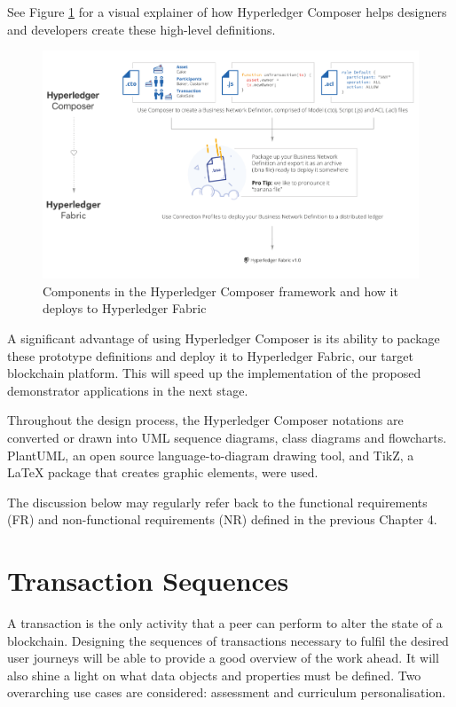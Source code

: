 See Figure \ref{fig:composer2fabric} for a visual explainer of how Hyperledger Composer
helps designers and developers create these high-level definitions.

\begin{figure}[!ht]
	\centering
	\includegraphics[width=1.0\textwidth]{composer2fabric}
	\caption[Hyperledger Composer]
	{Components in the Hyperledger Composer framework and how it deploys to
		Hyperledger Fabric \citep{cuicapuza2017composer}}
	\label{fig:composer2fabric}
\end{figure}

A significant advantage of using Hyperledger Composer is its ability to package these
prototype definitions and deploy it to Hyperledger Fabric, our target blockchain platform.
This will speed up the implementation of the proposed demonstrator applications
in the next stage.

Throughout the design process, the Hyperledger Composer notations are converted or drawn into UML sequence
diagrams, class diagrams and flowcharts. PlantUML, an open source language-to-diagram drawing tool,
and TikZ, a LaTeX package that creates graphic elements, were used.

The discussion below may regularly refer back to the functional requirements (FR) and
non-functional requirements (NR) defined in the previous Chapter 4.

\section{Transaction Sequences}

A transaction is the only activity that a peer can perform to alter the state of a blockchain.
Designing the sequences of transactions necessary to fulfil the desired user journeys will
be able to provide a good overview of the work ahead. It will also shine a light on
what data objects and properties must be defined. Two overarching use cases are considered:
assessment and curriculum personalisation.

